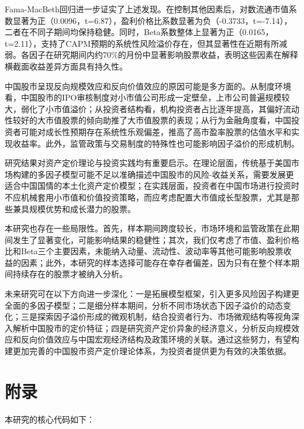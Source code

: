 \documentclass[12pt, a4paper]{article}
\begin{document}
Fama-MacBeth回归进一步证实了上述发现。在控制其他因素后，对数流通市值系数显著为正（0.0096，t=6.87），盈利价格比系数显著为负（-0.3733，t=-7.14），二者在不同子期间均保持稳健。同时，Beta系数整体上显著为正（0.0165，t=2.11），支持了CAPM预期的系统性风险溢价存在，但其显著性在近期有所减弱。各因子在研究期间内约70\%的月份中显著影响股票收益，表明这些因素在解释横截面收益差异方面具有持久性。

中国股市呈现反向规模效应和反向价值效应的原因可能是多方面的。从制度环境看，中国股市的IPO审核制度对小市值公司形成一定壁垒，上市公司普遍规模较大，弱化了小市值溢价；从投资者结构看，机构投资者占比逐年提高，其偏好流动性较好的大市值股票的倾向助推了大市值股票的表现；从行为金融角度看，中国投资者可能对成长性预期存在系统性乐观偏差，推高了高市盈率股票的估值水平和实现收益率。此外，监管政策与交易制度的特殊性也可能影响因子溢价的形成机制。

研究结果对资产定价理论与投资实践均有重要启示。在理论层面，传统基于美国市场构建的多因子模型可能不足以准确描述中国股市的风险-收益关系，需要发展更适合中国国情的本土化资产定价模型；在实践层面，投资者在中国市场进行投资时不应机械套用小市值和价值投资策略，而应考虑配置大市值成长型股票，尤其是那些兼具规模优势和成长潜力的股票。

本研究也存在一些局限性。首先，样本期间跨度较长，市场环境和监管政策在此期间发生了显著变化，可能影响结果的稳健性；其次，我们仅考虑了市值、盈利价格比和Beta三个主要因素，未能纳入动量、流动性、波动率等其他可能影响股票收益的因素；此外，本研究的样本选择可能存在幸存者偏差，因为只有在整个样本期间持续存在的股票才被纳入分析。

未来研究可在以下方向进一步深化：一是拓展模型框架，引入更多风险因子构建更全面的多因子模型；二是细分样本期间，分析不同市场状态下因子溢价的动态变化；三是探索因子溢价形成的微观机制，结合投资者行为、市场微观结构等视角深入解析中国股市的定价特征；四是研究资产定价异象的经济意义，分析反向规模效应和反向价值效应与中国宏观经济结构及政策环境的关联。通过这些努力，有望构建更加完善的中国股市资产定价理论体系，为投资者提供更为有效的决策依据。

\printbibliography[title=参考文献]

\section{附录}

本研究的核心代码如下：
\end{document}
